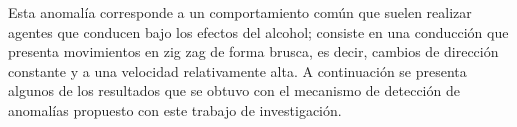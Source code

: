 Esta anomal\'{i}a corresponde a un comportamiento com\'{u}n que suelen realizar agentes que conducen bajo los efectos del alcohol; consiste en una conducci\'{o}n que presenta movimientos en zig zag de forma brusca, es decir, cambios de direcci\'{o}n constante y a una velocidad relativamente alta. A continuaci\'{o}n se presenta algunos de los resultados que se obtuvo con el mecanismo de detecci\'{o}n de anomal\'{i}as propuesto con este trabajo de investigaci\'{o}n.


\begin{figure}[H]
        \centering
        
\end{figure}
